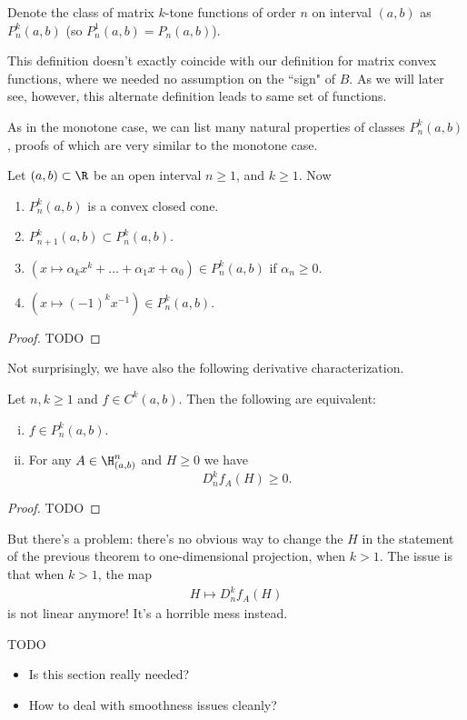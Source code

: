 Denote the class of matrix $k$-tone functions of order $n$ on interval $(a, b)$ as $P^{k}_{n}(a, b)$ (so $P^{1}_{n}(a, b) = P_{n}(a, b)$).

This definition doesn't exactly coincide with our definition for matrix convex functions, where we needed no assumption on the ``sign" of $B$. As we will later see, however, this alternate definition leads to same set of functions.


As in the monotone case, we can list many natural properties of classes $P^{k}_{n}(a, b)$, proofs of which are very similar to the monotone case.

\begin{prop}
	Let $(a, b) \subset \R$ be an open interval $n \geq 1$, and $k \geq 1$. Now
	\begin{enumerate}
		\item $P_{n}^{k}(a, b)$ is a convex closed cone.
		\item $P_{n + 1}^{k}(a, b) \subset P_{n}^{k}(a, b)$.
		\item $\left(x \mapsto \alpha_{k} x^{k} + \ldots + \alpha_{1} x + \alpha_{0}\right) \in P^{k}_{n}(a, b)$ if $\alpha_{n} \geq 0$.
		\item $\left(x \mapsto (-1)^k x^{-1}\right) \in P^{k}_{n}(a, b)$.
	\end{enumerate}
\end{prop}
\begin{proof}
	TODO
\end{proof}

Not surprisingly, we have also the following derivative characterization.

\begin{lause}
	Let $n, k \geq 1$ and $f \in C^{k}(a, b)$.
	Then the following are equivalent:
	\begin{enumerate}[(i)]
	\item $f \in P^{k}_{n}(a, b)$.
	\item For any $A \in \H^{n}_{(a, b)}$ and $H \geq 0$ we have
	\[
		D^{k}_{n}f_{A}(H) \geq 0.
	\]
	\end{enumerate}
\end{lause}
\begin{proof}
	TODO
\end{proof}

But there's a problem: there's no obvious way to change the $H$ in the statement of the previous theorem to one-dimensional projection, when $k > 1$. The issue is that when $k > 1$, the map
\begin{align*}
	H \mapsto D^{k}_{n}f_{A}(H)
\end{align*}
is not linear anymore! It's a horrible mess instead.

TODO

\begin{itemize}
	\item Is this section really needed?
	\item How to deal with smoothness issues cleanly?
\end{itemize}







